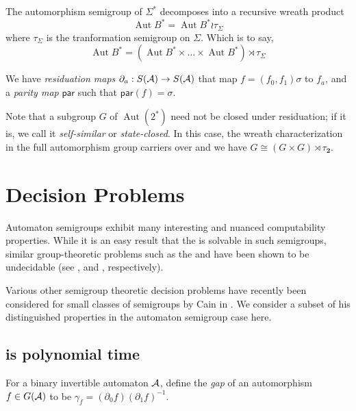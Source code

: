 \documentclass[11pt]{article}
\begin{document}
The automorphism semigroup of $\Sigma^*$ decomposes into a recursive
wreath product
\[
  \operatorname{Aut}B^* = \operatorname{Aut}B^* \wr \tau_\Sigma
\]
where $\tau_\Sigma$ is the tranformation semigroup on $\Sigma$. Which
is to say,
\[
  \operatorname{Aut}B^* = (\operatorname{Aut}B^* \times \ldots \times
  \operatorname{Aut}B^* ) \rtimes \tau_\Sigma
\]

We have \emph{residuation maps} $\partial_a : S(\mathcal{A}) \rightarrow S(\mathcal{A})$
that map $f = (f_0, f_1)\sigma$ to $f_a$, and a \emph{parity map}
$\textsf{par}$ such that $\textsf{par}(f) = \sigma$.

Note that a subgroup $G$ of $\operatorname{Aut}(2^*)$ need not be
closed under residuation; if it is, we call it \emph{self-similar} or
\emph{state-closed}. In this case, the wreath characterization in the
full automorphism group carriers over and we have
$G \cong (G \times G) \rtimes \tau_{\textbf{2}}$.



\section{Decision Problems}

Automaton semigroups exhibit many interesting and nuanced
computability properties. While it is an easy result that the
 is solvable in such semigroups, similar
group-theoretic problems such as the  and
 have been shown to be undecidable
(see \cite{sunic:conj}, and \cite{gillibert:finite}, respectively).

Various other semigroup theoretic decision problems have recently been
considered for small classes of semigroups by Cain in
\cite{Cain09:dec_prob}. We consider a subset of his distinguished
properties in the automaton semigroup case here.


\subsection{ is polynomial time}

For a binary invertible automaton $\mathcal{A}$, define the \emph{gap} of an
automorphism $f \in G(\mathcal{A})$ to be
$\gamma_f = (\partial_0 f)(\partial_1 f)^{-1}$.
\end{document}
